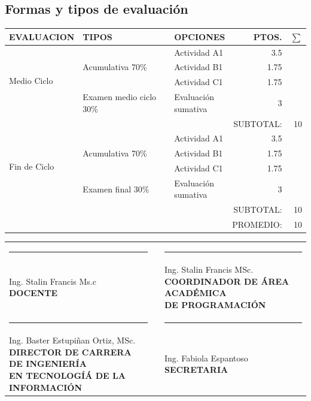 \documentclass[a4paper,12pt,spanish]{article}
\begin{document}
\restoregeometry

\subsection{Formas y tipos de evaluación}
\label{sec:formas-y-tipos}

\begin{tabular}[H]{|m{4cm}|m{5cm}|m{4cm}|r|r|}
  \hline \hline
  EVALUACION & TIPOS & OPCIONES & PTOS. & $\sum$ \\ \hline \hline
   \multirow{4}{*}{Medio Ciclo} & \multirow{3}{*}{Acumulativa 70\%} & Actividad A1 & 3.5 \\ \cline{3-3}
             &                                    & Actividad B1 & 1.75 \\ \cline{3-3}
             &                                    & Actividad C1 & 1.75\\ \cline{2-3}
             &Examen medio ciclo 30\% & Evaluación sumativa &3 \\ \hline \hline
  \multicolumn{4}{r}{SUBTOTAL:} & 10 \\ \hline
   \multirow{4}{*}{Fin de Ciclo} & \multirow{3}{*}{Acumulativa 70\%} & Actividad A1 & 3.5 \\ \cline{3-3}
             &                                    & Actividad B1 & 1.75 \\ \cline{3-3}
             &                                    & Actividad C1 & 1.75\\ \cline{2-3}
             &Examen final 30\% & Evaluación sumativa &3 \\ \hline \hline
  \multicolumn{4}{r}{SUBTOTAL:} & 10 \\ \hline
  \multicolumn{4}{r}{PROMEDIO:} & 10 \\ \hline

  
\end{tabular}

\vspace{0.3cm}
\begin{center}
\begin{tabular}[H]{lll}
  \rule{5cm}{0.4pt}&  &\rule{5cm}{0.4pt} \\
  \makecell[l]{Ing. Stalin Francis Ms.c\\\textbf{ DOCENTE}}  & &\makecell[l]{Ing. Stalin Francis MSc. \\ \textbf{COORDINADOR DE ÁREA ACADÉMICA} \\ \textbf{DE PROGRAMACIÓN}} \\ 


  \rule{7cm}{0.4pt}&  &\rule{5cm}{0.4pt} \\
  \makecell[l]{Ing. Baster Estupiñan Ortiz, MSc. \\ \textbf{DIRECTOR DE CARRERA DE INGENIERÍA} \\ \textbf{EN TECNOLOGÍÁ DE LA INFORMACIÓN}} & & \makecell[l]{Ing. Fabiola Espantoso \\ \textbf{SECRETARIA}} 
\end{tabular}
\end{center}
\end{document}
